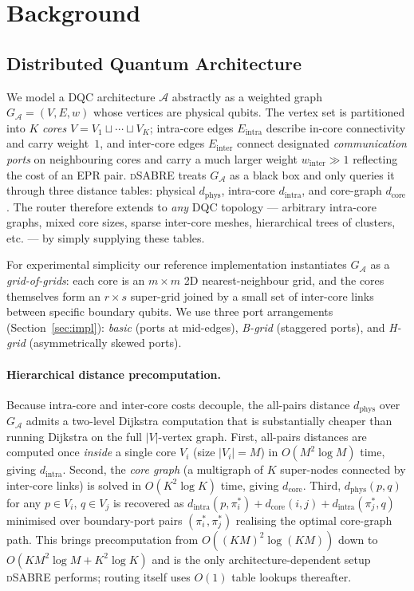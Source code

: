 \documentclass[conference]{IEEEtran}
\newcommand{\dSABRE}{\textsc{dSABRE}}
\newcommand{\arch}{\mathcal{A}}
\newcommand{\dphys}{d_{\mathrm{phys}}}
\newcommand{\dintra}{d_{\mathrm{intra}}}
\newcommand{\dcore}{d_{\mathrm{core}}}
\begin{document}
\section{Background}
\label{sec:background}

\subsection{Distributed Quantum Architecture}
\label{sec:arch}

We model a DQC architecture $\arch$ abstractly as a weighted graph
$G_\arch=(V,E,w)$ whose vertices are physical qubits.
The vertex set is partitioned into $K$ \emph{cores} $V = V_1\sqcup\cdots\sqcup V_K$;
intra-core edges $E_{\mathrm{intra}}$ describe in-core connectivity and carry
weight~$1$, and inter-core edges $E_{\mathrm{inter}}$ connect designated
\emph{communication ports} on neighbouring cores and carry a much larger
weight $w_{\mathrm{inter}} \gg 1$ reflecting the cost of an EPR pair.
\dSABRE{} treats $G_\arch$ as a black box and only queries it through three
distance tables: physical $\dphys$, intra-core $\dintra$, and core-graph
$\dcore$.
The router therefore extends to \emph{any} DQC topology --- arbitrary
intra-core graphs, mixed core sizes, sparse inter-core meshes, hierarchical
trees of clusters, etc. --- by simply supplying these tables.

For experimental simplicity our reference implementation instantiates
$G_\arch$ as a \emph{grid-of-grids}: each core is an $m\!\times\!m$ 2D
nearest-neighbour grid, and the cores themselves form an $r\!\times\!s$
super-grid joined by a small set of inter-core links between specific
boundary qubits.
We use three port arrangements (Section~\ref{sec:impl}): \emph{basic}
(ports at mid-edges), \emph{B-grid} (staggered ports), and \emph{H-grid}
(asymmetrically skewed ports).

\paragraph{Hierarchical distance precomputation.}
Because intra-core and inter-core costs decouple, the all-pairs distance
$\dphys$ over $G_\arch$ admits a two-level Dijkstra computation that is
substantially cheaper than running Dijkstra on the full $|V|$-vertex graph.
First, all-pairs distances are computed once \emph{inside} a single core
$V_i$ (size $|V_i|=M$) in $O(M^2 \log M)$ time, giving $\dintra$.
Second, the \emph{core graph} (a multigraph of $K$ super-nodes connected
by inter-core links) is solved in $O(K^2 \log K)$ time, giving $\dcore$.
Third, $\dphys(p,q)$ for any $p\in V_i$, $q\in V_j$ is recovered as
$\dintra(p,\pi_i^*) + \dcore(i,j) + \dintra(\pi_j^*,q)$ minimised over
boundary-port pairs $(\pi_i^*, \pi_j^*)$ realising the optimal core-graph
path.
This brings precomputation from $O((KM)^2 \log(KM))$ down to
$O(KM^2\log M + K^2\log K)$ and is the only architecture-dependent setup
\dSABRE{} performs; routing itself uses $O(1)$ table lookups thereafter.
\end{document}

